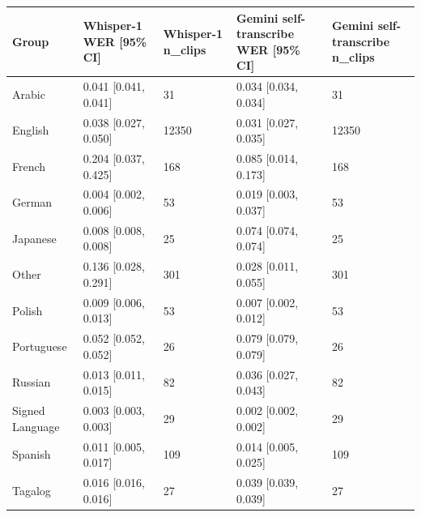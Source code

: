 \begin{tabular}{lllll}
\toprule
Group & Whisper-1 WER [95\% CI] & Whisper-1 n\_clips & Gemini self-transcribe WER [95\% CI] & Gemini self-transcribe n\_clips \\
\midrule
Arabic & 0.041 [0.041, 0.041] & 31 & 0.034 [0.034, 0.034] & 31 \\
English & 0.038 [0.027, 0.050] & 12350 & 0.031 [0.027, 0.035] & 12350 \\
French & 0.204 [0.037, 0.425] & 168 & 0.085 [0.014, 0.173] & 168 \\
German & 0.004 [0.002, 0.006] & 53 & 0.019 [0.003, 0.037] & 53 \\
Japanese & 0.008 [0.008, 0.008] & 25 & 0.074 [0.074, 0.074] & 25 \\
Other & 0.136 [0.028, 0.291] & 301 & 0.028 [0.011, 0.055] & 301 \\
Polish & 0.009 [0.006, 0.013] & 53 & 0.007 [0.002, 0.012] & 53 \\
Portuguese & 0.052 [0.052, 0.052] & 26 & 0.079 [0.079, 0.079] & 26 \\
Russian & 0.013 [0.011, 0.015] & 82 & 0.036 [0.027, 0.043] & 82 \\
Signed Language & 0.003 [0.003, 0.003] & 29 & 0.002 [0.002, 0.002] & 29 \\
Spanish & 0.011 [0.005, 0.017] & 109 & 0.014 [0.005, 0.025] & 109 \\
Tagalog & 0.016 [0.016, 0.016] & 27 & 0.039 [0.039, 0.039] & 27 \\
\bottomrule
\end{tabular}
